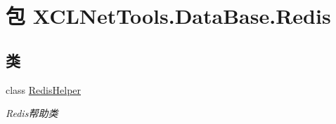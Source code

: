 \hypertarget{namespace_x_c_l_net_tools_1_1_data_base_1_1_redis}{\section{包 X\-C\-L\-Net\-Tools.\-Data\-Base.\-Redis}
\label{namespace_x_c_l_net_tools_1_1_data_base_1_1_redis}
}
\subsection*{类}
\begin{DoxyCompactItemize}
\item 
class \hyperlink{class_x_c_l_net_tools_1_1_data_base_1_1_redis_1_1_redis_helper}{Redis\-Helper}
\begin{DoxyCompactList}\small\item\em Redis帮助类 \end{DoxyCompactList}\end{DoxyCompactItemize}
